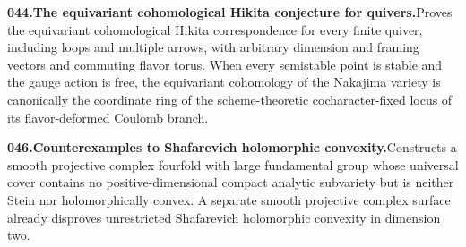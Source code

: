 \documentclass[11pt,a4paper]{article}
\begin{document}
  \par \begin{minipage}{\linewidth}
  \fontsize{10.5}{12.6}\selectfont\RaggedRight
  \hypertarget{result 044}{}
  {\bfseries\textcolor{muted}{044.}\enspace The equivariant cohomological Hikita conjecture for quivers.}\enspace Proves the equivariant cohomological Hikita correspondence for every finite quiver, including loops and multiple arrows, with arbitrary dimension and framing vectors and commuting flavor torus. When every semistable point is stable and the gauge action is free, the equivariant cohomology of the Nakajima variety is canonically the coordinate ring of the scheme-theoretic cocharacter-fixed locus of its flavor-deformed Coulomb branch.\par
  \end{minipage}\par\vspace{5pt}



  \par \begin{minipage}{\linewidth}
  \fontsize{10.5}{12.6}\selectfont\RaggedRight
  \hypertarget{result 046}{}
  {\bfseries\textcolor{muted}{046.}\enspace Counterexamples to Shafarevich holomorphic convexity.}\enspace Constructs a smooth projective complex fourfold with large fundamental group whose universal cover contains no positive-dimensional compact analytic subvariety but is neither Stein nor holomorphically convex. A separate smooth projective complex surface already disproves unrestricted Shafarevich holomorphic convexity in dimension two.\par
  \end{minipage}\par\vspace{5pt}
\end{document}
